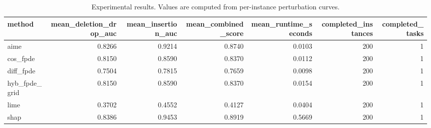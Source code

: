 \begin{table}[t]
\caption{Experimental results. Values are computed from per-instance perturbation curves.}
\label{tab:main_results_computed}
\centering
\begin{tabular}{lrrrrrr}
\toprule
method & mean\_deletion\_drop\_auc & mean\_insertion\_auc & mean\_combined\_score & mean\_runtime\_seconds & completed\_instances & completed\_tasks \\
\midrule
aime & 0.8266 & 0.9214 & 0.8740 & 0.0103 & 200 & 1 \\
cos\_fpde & 0.8150 & 0.8590 & 0.8370 & 0.0112 & 200 & 1 \\
diff\_fpde & 0.7504 & 0.7815 & 0.7659 & 0.0098 & 200 & 1 \\
hyb\_fpde\_grid & 0.8150 & 0.8590 & 0.8370 & 0.0154 & 200 & 1 \\
lime & 0.3702 & 0.4552 & 0.4127 & 0.0404 & 200 & 1 \\
shap & 0.8386 & 0.9453 & 0.8919 & 0.5669 & 200 & 1 \\
\bottomrule
\end{tabular}

\end{table}
